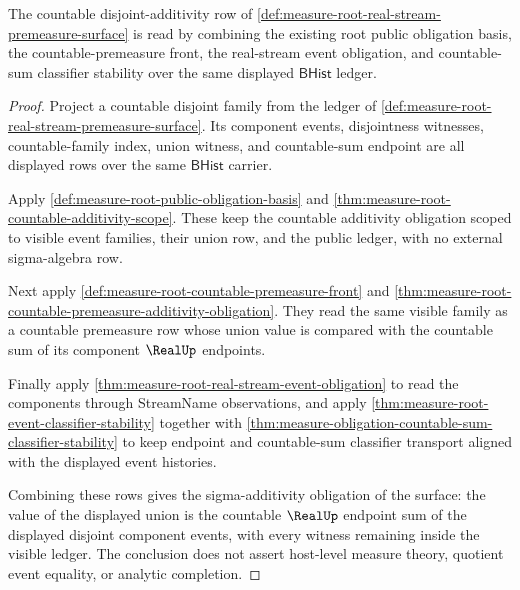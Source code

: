 \begin{theorem}
\label{thm:measure-root-real-stream-premeasure-sigma-additivity-obligation}
The countable disjoint-additivity row of
\autoref{def:measure-root-real-stream-premeasure-surface} is read by combining
the existing root public obligation basis, the countable-premeasure front, the
real-stream event obligation, and countable-sum classifier stability over the
same displayed $\mathsf{BHist}$ ledger.
\end{theorem}
\begin{proof}
Project a countable disjoint family from the ledger of
\autoref{def:measure-root-real-stream-premeasure-surface}. Its component
events, disjointness witnesses, countable-family index, union witness, and
countable-sum endpoint are all displayed rows over the same
$\mathsf{BHist}$ carrier.

Apply \autoref{def:measure-root-public-obligation-basis} and
\autoref{thm:measure-root-countable-additivity-scope}. These keep the
countable additivity obligation scoped to visible event families, their union
row, and the public ledger, with no external sigma-algebra row.

Next apply \autoref{def:measure-root-countable-premeasure-front} and
\autoref{thm:measure-root-countable-premeasure-additivity-obligation}. They
read the same visible family as a countable premeasure row whose union value
is compared with the countable sum of its component $\RealUp$ endpoints.

Finally apply \autoref{thm:measure-root-real-stream-event-obligation} to read
the components through StreamName observations, and apply
\autoref{thm:measure-root-event-classifier-stability} together with
\autoref{thm:measure-obligation-countable-sum-classifier-stability} to keep
endpoint and countable-sum classifier transport aligned with the displayed
event histories.

Combining these rows gives the sigma-additivity obligation of the surface:
the value of the displayed union is the countable $\RealUp$ endpoint sum of
the displayed disjoint component events, with every witness remaining inside
the visible ledger. The conclusion does not assert host-level measure theory,
quotient event equality, or analytic completion.
\end{proof}
